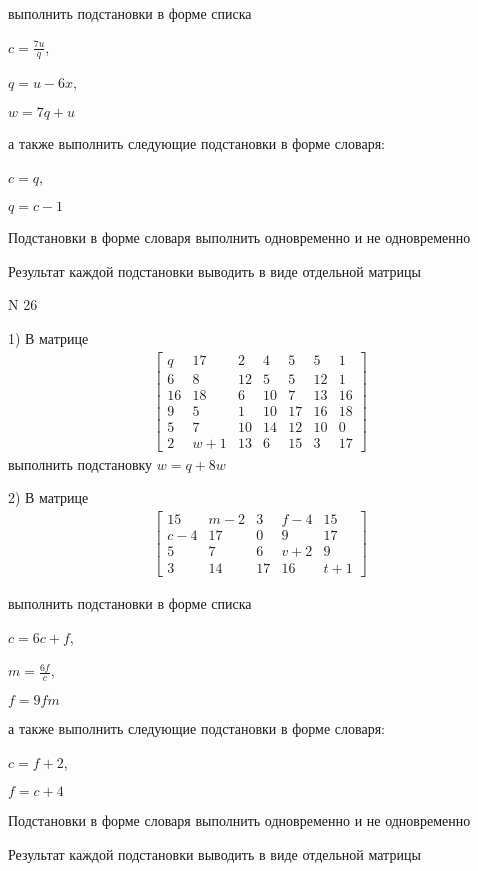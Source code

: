 \documentclass[11pt]{report}
\begin{document}
выполнить подстановки в форме списка

$c=\frac{7 u}{q}$,

$q=u - 6 x$,

$w=7 q + u$

а также выполнить следующие подстановки в форме словаря:

$c=q$,

$q=c - 1$


    Подстановки в форме словаря выполнить одновременно и не одновременно


    Результат каждой подстановки выводить в виде отдельной матрицы

\newpage
N 26


    1) В матрице
\begin{align*}
\left[\begin{matrix}q & 17 & 2 & 4 & 5 & 5 & 1\\6 & 8 & 12 & 5 & 5 & 12 & 1\\16 & 18 & 6 & 10 & 7 & 13 & 16\\9 & 5 & 1 & 10 & 17 & 16 & 18\\5 & 7 & 10 & 14 & 12 & 10 & 0\\2 & w + 1 & 13 & 6 & 15 & 3 & 17\end{matrix}\right]
\end{align*}
выполнить подстановку $w=q + 8 w$


    2) В матрице
\begin{align*}
\left[\begin{matrix}15 & m - 2 & 3 & f - 4 & 15\\c - 4 & 17 & 0 & 9 & 17\\5 & 7 & 6 & v + 2 & 9\\3 & 14 & 17 & 16 & t + 1\end{matrix}\right]
\end{align*}

выполнить подстановки в форме списка

$c=6 c + f$,

$m=\frac{6 f}{c}$,

$f=9 f m$

а также выполнить следующие подстановки в форме словаря:

$c=f + 2$,

$f=c + 4$


    Подстановки в форме словаря выполнить одновременно и не одновременно


    Результат каждой подстановки выводить в виде отдельной матрицы
\end{document}
